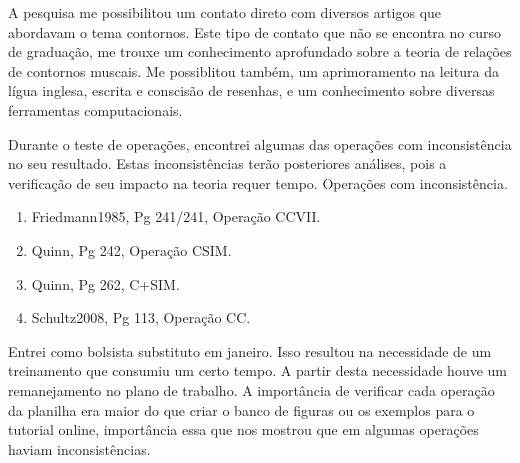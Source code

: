\documentclass[11pt]{article}
\begin{document}
A pesquisa me possibilitou um contato direto com diversos artigos que abordavam
o tema contornos. Este tipo de contato que não se encontra no curso de graduação,
me trouxe um conhecimento aprofundado sobre a teoria de relações de contornos muscais.
Me possiblitou também, um aprimoramento na leitura da lígua inglesa, escrita e conscisão
de resenhas, e um conhecimento sobre diversas ferramentas computacionais.


Durante o teste de operações, encontrei algumas das operações com 
inconsistência no seu resultado. Estas inconsistências terão posteriores 
análises, pois a verificação de seu impacto na teoria requer tempo.
Operações com inconsistência.
\begin{enumerate}
\item Friedmann1985, Pg 241/241, Operação CCVII.
\item Quinn, Pg 242, Operação CSIM.
\item Quinn, Pg 262, C+SIM.
\item Schultz2008, Pg 113, Operação CC.
\end{enumerate}

Entrei como bolsista substituto em janeiro. Isso resultou na necessidade
de um treinamento que consumiu um certo tempo. A partir desta necessidade
houve um remanejamento no plano de trabalho. A importância de verificar cada operação
da planilha era maior do que criar o banco de figuras ou os exemplos para o
tutorial online, importância essa que nos mostrou que em algumas operações
haviam inconsistências.


\renewcommand{\refname}{Referências bibliográficas (máximo 15)}
\nocite{
  Friedmann1985,
  Friedmann1987,
  Morris1987,
  Marvin1988,
  Polansky1992,
  Morris1993,
  Clifford1995,
  Quinn1997,
  Beard2003,
  Sampaio2008,
  Schultz2008,
  Schultz2009,
  Bor2009
}





\end{document}
